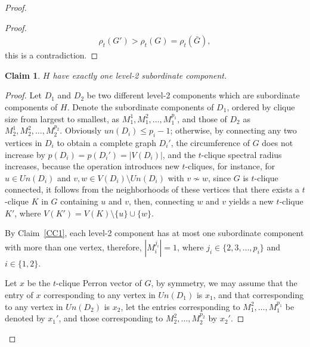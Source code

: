 \documentclass[preprint,12pt]{elsarticle}
\newtheorem{claim}{Claim}[thm]
\begin{document}
\begin{proof}
\begin{proof}
                    \begin{align*}
                        \rho_t(G') > \rho_t(G) = \rho_t(\bar{G}),
                    \end{align*}
                this is a contradiction.
            \end{proof}


            \begin{claim}\label{CC2}
                $H$ have exactly one level-2 subordinate component.
            \end{claim}

            \begin{proof}

                Let $D_1$ and $D_2$ be two different level-2 components which are subordinate components of $H$. Denote the subordinate components of $D_1$, ordered by clique size from largest to smallest, as $M_1^1, M_1^2, \ldots, M_1^{p_1}$, and those of $D_2$ as $M_2^1, M_2^2, \ldots, M_2^{p_2}$.
                Obviously $un(D_i) \leq p_i - 1$; otherwise, by connecting any two vertices in $D_i$ to obtain a  complete graph $D_i'$, the circumference of $G$ does not increase by $p(D_i)=p(D_i')=|V(D_i)|$, and the $t$-clique spectral radius increases, because the operation introduces new $t$-cliques, for instance, for $u \in Un(D_i)$ and $v, w \in V(D_i) \setminus Un(D_i)$ with $v \nsim w$, since $G$ is $t$-clique connected, it follows from the neighborhoods of these vertices that there exists a $t$-clique $K$ in $G$ containing $u$ and $v$, then, connecting $w$ and $v$ yields a new $t$-clique $K'$, where $V(K') = V(K) \setminus \{u\} \cup \{w\}$.

                By Claim~\ref{CC1}, each level-2 component has at most one subordinate component with more than one vertex, therefore, $|M_i^{j_i}| = 1$, where $j_i \in \{2,3,\ldots,p_i\}$ and $i \in \{1,2\}$.

                Let $x$ be the $t$-clique Perron vector of $G$, by symmetry, we may assume that the entry of $x$ corresponding to any vertex in $Un(D_1)$ is $x_1$, and that corresponding to any vertex in $Un(D_2)$ is $x_2$, let the entries corresponding to $M_1^2, \ldots, M_1^{p_1}$ be denoted by $x_1'$, and those corresponding to $M_2^2, \ldots, M_2^{p_2}$ by $x_2'$.


\end{proof}
\end{proof}
\end{document}
